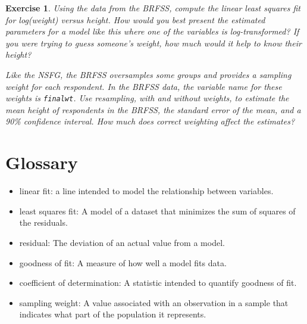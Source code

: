 \documentclass[12pt]{book}
\theoremstyle{exercise}
\newtheorem{exercise}{Exercise}[chapter]
\begin{document}
\begin{exercise}

Using the data from the BRFSS, compute the linear least squares
fit for log(weight) versus height.
How would you best present the estimated parameters for a model
like this where one of the variables is log-transformed?
If you were trying to guess
someone's weight, how much would it help to know their height?%
%
%

Like the NSFG, the BRFSS oversamples some groups and provides
a sampling weight for each respondent.  In the BRFSS data, the variable
name for these weights is {\tt finalwt}.
Use resampling, with and without weights, to estimate the mean height
of respondents in the BRFSS, the standard error of the mean, and a
90\% confidence interval.  How much does correct weighting affect the
estimates?%
%
%
%
\end{exercise}


\section{Glossary}

\begin{itemize}

\item linear fit: a line intended to model the relationship between
variables.%

\item least squares fit: A model of a dataset that minimizes the
sum of squares of the residuals.%

\item residual: The deviation of an actual value from a model.%

\item goodness of fit: A measure of how well a model fits data.%

\item coefficient of determination: A statistic intended to
quantify goodness of fit.%

\item sampling weight: A value associated with an observation in a
  sample that indicates what part of the population it represents.%

\end{itemize}
\end{document}

